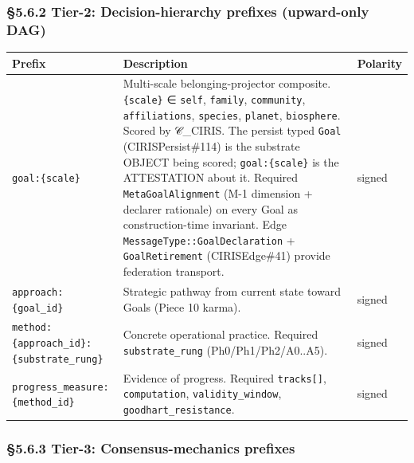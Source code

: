 \documentclass[11pt]{article}
\begin{document}
\subsubsection*{§5.6.2 Tier-2: Decision-hierarchy prefixes (upward-only DAG)}


{\footnotesize
\begin{longtable}{|p{5.33cm}|p{5.33cm}|p{5.33cm}|}\hline
\textbf{Prefix} & \textbf{Description} & \textbf{Polarity} \\ \hline\endhead
\texttt{goal:\{scale\}} & Multi-scale belonging-projector composite. \texttt{\{scale\}} ∈ \texttt{self}, \texttt{family}, \texttt{community}, \texttt{affiliations}, \texttt{species}, \texttt{planet}, \texttt{biosphere}. Scored by 𝒞\_CIRIS. The persist typed \texttt{Goal} (CIRISPersist\#114) is the substrate OBJECT being scored; \texttt{goal:\{scale\}} is the ATTESTATION about it. Required \texttt{MetaGoalAlignment} (M-1 dimension + declarer rationale) on every Goal as construction-time invariant. Edge \texttt{MessageType::GoalDeclaration} + \texttt{GoalRetirement} (CIRISEdge\#41) provide federation transport. & signed \\ \hline
\texttt{approach:\{goal\_id\}} & Strategic pathway from current state toward Goals (Piece 10 karma). & signed \\ \hline
\texttt{method:\{approach\_id\}:\{substrate\_rung\}} & Concrete operational practice. Required \texttt{substrate\_rung} (Ph0/Ph1/Ph2/A0..A5). & signed \\ \hline
\texttt{progress\_measure:\{method\_id\}} & Evidence of progress. Required \texttt{tracks[]}, \texttt{computation}, \texttt{validity\_window}, \texttt{goodhart\_resistance}. & signed \\ \hline
\end{longtable}}


\subsubsection*{§5.6.3 Tier-3: Consensus-mechanics prefixes}
\end{document}
